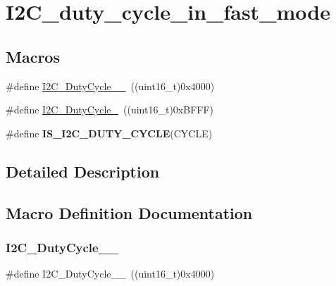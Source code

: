 \hypertarget{group___i2_c__duty__cycle__in__fast__mode}{}\section{I2\+C\+\_\+duty\+\_\+cycle\+\_\+in\+\_\+fast\+\_\+mode}
\label{group___i2_c__duty__cycle__in__fast__mode}
\subsection*{Macros}
\begin{DoxyCompactItemize}
\item 
\#define \mbox{\hyperlink{group___i2_c__duty__cycle__in__fast__mode_ga2b4ff186808a8095fc2d1b8193f30ce1}{I2\+C\+\_\+\+Duty\+Cycle\+\_\+\_}}~((uint16\+\_\+t)0x4000)
\item 
\#define \mbox{\hyperlink{group___i2_c__duty__cycle__in__fast__mode_gafe0af31970aceef0fa8df6a10bef35db}{I2\+C\+\_\+\+Duty\+Cycle\+\_}}~((uint16\+\_\+t)0x\+B\+F\+F\+F)
\item 
\#define {\bfseries I\+S\+\_\+\+I2\+C\+\_\+\+D\+U\+T\+Y\+\_\+\+C\+Y\+C\+LE}(C\+Y\+C\+LE)
\end{DoxyCompactItemize}


\subsection{Detailed Description}


\subsection{Macro Definition Documentation}
\mbox{\label{group___i2_c__duty__cycle__in__fast__mode_ga2b4ff186808a8095fc2d1b8193f30ce1}} 
\subsubsection{\texorpdfstring{I2\+C\+\_\+\+Duty\+Cycle\+\_\+\_}{I2C\_DutyCycle\_16\_9}}
{\footnotesize\ttfamily \#define I2\+C\+\_\+\+Duty\+Cycle\+\_\+\_~((uint16\+\_\+t)0x4000)}

